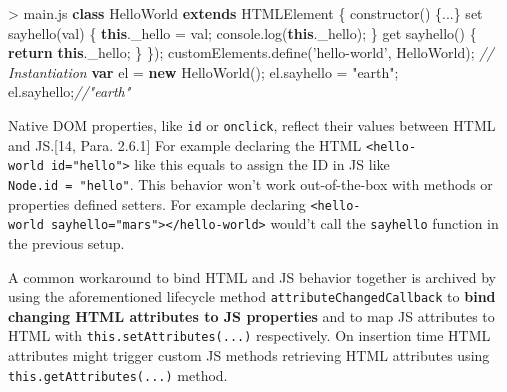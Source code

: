 \documentclass[]{article}
\newenvironment{Shaded}{}{}
\newcommand{\KeywordTok}[1]{\textcolor[rgb]{0.00,0.44,0.13}{\textbf{{#1}}}}
\newcommand{\StringTok}[1]{\textcolor[rgb]{0.25,0.44,0.63}{{#1}}}
\newcommand{\CommentTok}[1]{\textcolor[rgb]{0.38,0.63,0.69}{\textit{{#1}}}}
\newcommand{\VariableTok}[1]{\textcolor[rgb]{0.10,0.09,0.49}{{#1}}}
\newcommand{\ControlFlowTok}[1]{\textcolor[rgb]{0.00,0.44,0.13}{\textbf{{#1}}}}
\newcommand{\OperatorTok}[1]{\textcolor[rgb]{0.40,0.40,0.40}{{#1}}}
\newcommand{\AttributeTok}[1]{\textcolor[rgb]{0.49,0.56,0.16}{{#1}}}
\newcommand{\NormalTok}[1]{{#1}}
\begin{document}
\begin{Shaded}
\begin{Highlighting}[]
\OperatorTok{>} \VariableTok{main}\NormalTok{.}\AttributeTok{js}
\KeywordTok{class} \NormalTok{HelloWorld }\KeywordTok{extends} \NormalTok{HTMLElement }\OperatorTok{\{}
 \AttributeTok{constructor}\NormalTok{() }\OperatorTok{\{}\NormalTok{...}\OperatorTok{\}}
 \NormalTok{set }\AttributeTok{sayhello}\NormalTok{(val) }\OperatorTok{\{}
  \KeywordTok{this}\NormalTok{.}\AttributeTok{_hello} \OperatorTok{=} \NormalTok{val}\OperatorTok{;}
  \VariableTok{console}\NormalTok{.}\AttributeTok{log}\NormalTok{(}\KeywordTok{this}\NormalTok{.}\AttributeTok{_hello}\NormalTok{)}\OperatorTok{;}
 \OperatorTok{\}}
 \NormalTok{get }\AttributeTok{sayhello}\NormalTok{() }\OperatorTok{\{}
  \ControlFlowTok{return} \KeywordTok{this}\NormalTok{.}\AttributeTok{_hello}\OperatorTok{;}
 \OperatorTok{\}}
\OperatorTok{\}}\NormalTok{)}\OperatorTok{;}
\VariableTok{customElements}\NormalTok{.}\AttributeTok{define}\NormalTok{(}\StringTok{'hello-world'}\OperatorTok{,} \NormalTok{HelloWorld)}\OperatorTok{;}
\CommentTok{// Instantiation}
\KeywordTok{var} \NormalTok{el }\OperatorTok{=} \KeywordTok{new} \AttributeTok{HelloWorld}\NormalTok{()}\OperatorTok{;}
\VariableTok{el}\NormalTok{.}\AttributeTok{sayhello} \OperatorTok{=} \StringTok{"earth"}\OperatorTok{;}
\VariableTok{el}\NormalTok{.}\AttributeTok{sayhello}\OperatorTok{;}\CommentTok{//"earth"}
\end{Highlighting}
\end{Shaded}

Native DOM properties, like \texttt{id} or \texttt{onclick}, reflect
their values between HTML and JS.{[}14, Para. 2.6.1{]} For example
declaring the HTML
\texttt{\textless{}hello-world\ id="hello"\textgreater{}} like this
equals to assign the ID in JS like \texttt{Node.id\ =\ "hello"}. This
behavior won't work out-of-the-box with methods or properties defined
setters. For example declaring
\texttt{\textless{}hello-world\ sayhello="mars"\textgreater{}\textless{}/hello-world\textgreater{}}
would't call the \texttt{sayhello} function in the previous setup.

A common workaround to bind HTML and JS behavior together is archived by
using the aforementioned lifecycle method
\texttt{attributeChangedCallback} to \textbf{bind changing HTML
attributes to JS properties} and to map JS attributes to HTML with
\texttt{this.setAttributes(...)} respectively. On insertion time HTML
attributes might trigger custom JS methods retrieving HTML attributes
using \texttt{this.getAttributes(...)} method.
\end{document}
